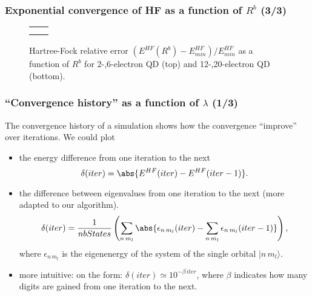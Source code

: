 \documentclass[xcolor=pdftex,hyperref={pdfpagelabels=false},table]{beamer}
\begin{document}
\begin{frame}
\frametitle{Exponential convergence of HF as a function of $R^b$ (3/3)}
\begin{scriptsize}
\begin{figure}
	\begin{center}
\begin{tabular}{cc}
	\scalebox{0.35}{} & 	\scalebox{0.35}{}  \\
	\scalebox{0.35}{}  & 	\scalebox{0.35}{}  \\
\end{tabular}
	\end{center}
	\vspace{-5pt}
	\caption{Hartree-Fock relative error $(E^{HF}(R^b)-E^{HF}_{min})/E^{HF}_{min}$ as a function of $R^b$ for 2-,6-electron QD (top) and 12-,20-electron QD (bottom).}
\end{figure}
\end{scriptsize}
\end{frame}


\begin{frame}
\frametitle{``Convergence history'' as a function of $\lambda$ (1/3)}
\begin{scriptsize}
\begin{definition}
The convergence history of a simulation shows how the convergence ``improve'' over iterations.
We could plot
\begin{itemize}
 \item the energy difference from one iteration to the next
\begin{equation*}
\delta (iter)= \abs{E^{HF}(iter)-E^{HF}(iter-1)}.
\end{equation*}
\item  the difference between eigenvalues from one iteration to the next (more adapted to our algorithm).
\begin{equation*}
\delta (iter)= \frac{1}{nbStates} \left( \sum_{n\,m_l} \abs{\epsilon_{n\,m_l}(iter)-\sum_{n\,m_l} \epsilon_{n\,m_l}(iter-1)} \right),
\end{equation*}
where $\epsilon_{n\,m_l}$ is the eigenenergy of the system of the single orbital $|n\,m_l \rangle$.
\item more intuitive: on the form:  $\delta (iter) \simeq 10^{- \beta \, iter}$, where $\beta$ indicates how many digits are gained from one iteration to the next.
\end{itemize}

\end{definition}
\end{scriptsize}
\end{frame}
\end{document}
